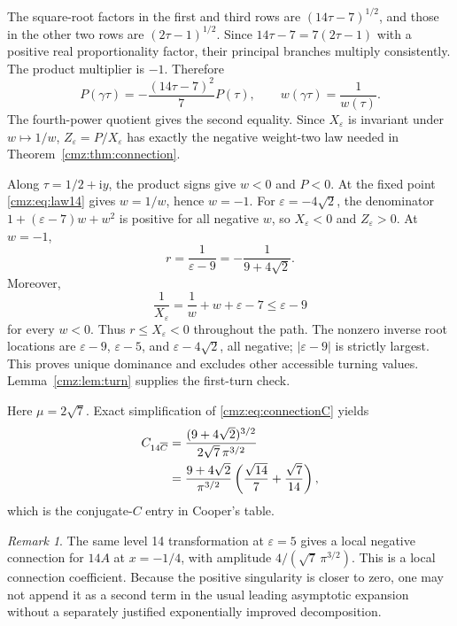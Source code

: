 \documentclass[11pt,letterpaper]{article}
\numberwithin{equation}{section}
\theoremstyle{definition}\newtheorem{definition}[theorem]{Definition}
\theoremstyle{remark}\newtheorem{remark}[theorem]{Remark}
\newcommand{\eps}{\varepsilon}
\newcommand{\ii}{\mathrm i}
\begin{document}
The square-root factors in the first and third rows are $(14\tau-7)^{1/2}$, and those in the other two rows are $(2\tau-1)^{1/2}$. Since $14\tau-7=7(2\tau-1)$ with a positive real proportionality factor, their principal branches multiply consistently. The product multiplier is $-1$. Therefore
\begin{equation}
P(\gamma\tau)=-\frac{(14\tau-7)^2}{7}P(\tau),\qquad
w(\gamma\tau)=\frac1{w(\tau)}.
\label{cmz:eq:law14}
\end{equation}
The fourth-power quotient gives the second equality. Since $X_\eps$ is invariant under $w\mapsto1/w$, $Z_\eps=P/X_\eps$ has exactly the negative weight-two law needed in Theorem~\ref{cmz:thm:connection}.

Along $\tau=1/2+\ii y$, the product signs give $w<0$ and $P<0$. At the fixed point \eqref{cmz:eq:law14} gives $w=1/w$, hence $w=-1$. For $\eps=-4\sqrt2$, the denominator $1+(\eps-7)w+w^2$ is positive for all negative $w$, so $X_\eps<0$ and $Z_\eps>0$. At $w=-1$,
\[
r=\frac1{\eps-9}=-\frac1{9+4\sqrt2}.
\]
Moreover,
\begin{equation}
\frac1{X_\eps}=\frac1w+w+\eps-7\leq\eps-9
\label{cmz:eq:14negativebound}
\end{equation}
for every $w<0$. Thus $r\leq X_\eps<0$ throughout the path. The nonzero inverse root locations are $\eps-9$, $\eps-5$, and $\eps-4\sqrt2$, all negative; $|\eps-9|$ is strictly largest. This proves unique dominance and excludes other accessible turning values. Lemma~\ref{cmz:lem:turn} supplies the first-turn check.

Here $\mu=2\sqrt7$. Exact simplification of \eqref{cmz:eq:connectionC} yields
\begin{align}
C_{14\overline C}
&=\frac{(9+4\sqrt2)^{3/2}}{2\sqrt7\,\pi^{3/2}}\notag\\
&=\frac{9+4\sqrt2}{\pi^{3/2}}
       \left(\frac{\sqrt{14}}7+\frac{\sqrt7}{14}\right),
\label{cmz:eq:C14bar}
\end{align}
which is the conjugate-$C$ entry in Cooper's table.

\begin{remark}
The same level 14 transformation at $\eps=5$ gives a local negative connection for $14A$ at $x=-1/4$, with amplitude $4/(\sqrt7\,\pi^{3/2})$. This is a local connection coefficient. Because the positive singularity is closer to zero, one may not append it as a second term in the usual leading asymptotic expansion without a separately justified exponentially improved decomposition.
\end{remark}
\end{document}
